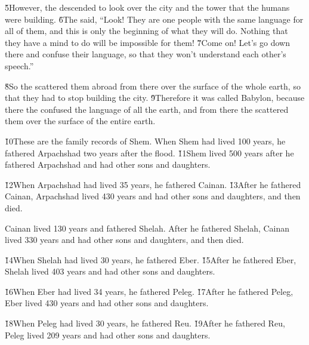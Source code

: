 \v{5}However, the  descended to look over the city and the tower that the humans were building. \v{6}The  said, ``Look! They are one people with the same language for all of them, and this is only the beginning of what they will do. Nothing that they have a mind to do will be impossible for them! \v{7}Come on! Let's go down there and confuse their language, so that they won't understand each other's speech.''

\v{8}So the  scattered them abroad from there over the surface of the whole earth, so that they had to stop building the city. \v{9}Therefore it was called Babylon, because there the  confused the language of all the earth, and from there the  scattered them over the surface of the entire earth.

\v{10}These are the family records of Shem. When Shem had lived 100 years, he fathered Arpachshad two years after the flood. \v{11}Shem lived 500 years after he fathered Arpachshad and had other sons and daughters.

\v{12}When Arpachshad had lived 35 years, he fathered Cainan. \v{13}After he fathered Cainan, Arpachshad lived 430 years and had other sons and daughters, and then died.

Cainan lived 130 years and fathered Shelah. After he fathered Shelah, Cainan lived 330 years and had other sons and daughters, and then died.

\v{14}When Shelah had lived 30 years, he fathered Eber. \v{15}After he fathered Eber, Shelah lived 403 years and had other sons and daughters.

\v{16}When Eber had lived 34 years, he fathered Peleg. \v{17}After he fathered Peleg, Eber lived 430 years and had other sons and daughters.

\v{18}When Peleg had lived 30 years, he fathered Reu. \v{19}After he fathered Reu, Peleg lived 209 years and had other sons and daughters.

